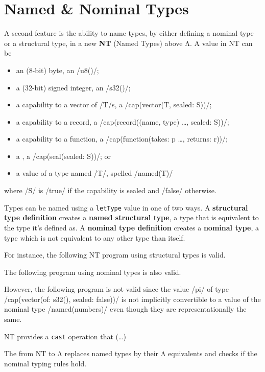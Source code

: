 \documentclass[main.tex]{subfiles}
\begin{document}
\section{Named \& Nominal Types} \label{sct:named-ty}
A second feature is the ability to name types, by either defining a nominal type or a structural type, in a new  \textbf{NT} (Named Types) above Λ. A value in NT can be
\begin{itemize}[nosep]
	\item an (8-bit) byte, an \iil/u8()/;
	\item a (32-bit) signed integer, an \iil/s32()/;
	\item a capability to a vector of \iil/T/s, a \iil/cap(vector(T, sealed: S))/;
	\item a capability to a record, a \iil/cap(record((name, type) …, sealed: S))/;
	\item a capability to a function, a \iil/cap(function(takes: p …, returns: r))/;
	\item a , a \iil/cap(seal(sealed: S))/; or
	\item a value of a type named \iil/T/, spelled \iil/named(T)/
\end{itemize}
where \iil/S/ is \iil/true/ if the capability is sealed and \iil/false/ otherwise.

Types can be named using a \texttt{letType} value in one of two ways. A \textbf{structural type definition} creates a \textbf{named structural type}, a type that is equivalent to the type it's defined as. A \textbf{nominal type definition} creates a \textbf{nominal type}, a type which is not equivalent to any other type than itself.

For instance, the following NT program using structural types is valid.

The following program using nominal types is also valid.

However, the following program is not valid since the value \iil/pi/ of type \\ \iil/cap(vector(of: s32(), sealed: false))/ is not implicitly convertible to a value of the nominal type \iil/named(numbers)/ even though they are representationally the same.

NT provides a \texttt{cast} operation that (…)

The  from NT to Λ replaces named types by their Λ equivalents and checks if the nominal typing rules hold.
\end{document}
